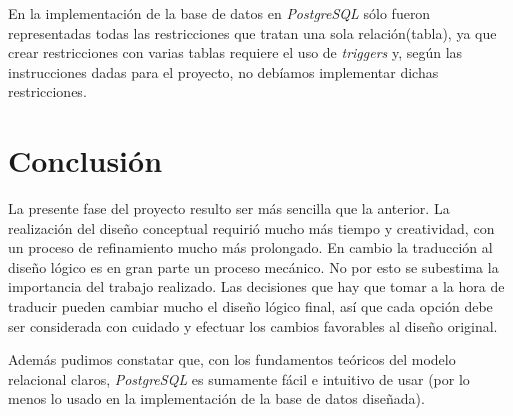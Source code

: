 \documentclass[]{report}
\begin{document}
	En la implementación de la base de datos en \emph{PostgreSQL} sólo fueron representadas todas las restricciones que tratan una sola relación(tabla), ya que crear restricciones con varias tablas requiere el uso de \emph{triggers} y, según las instrucciones dadas para el proyecto, no debíamos implementar dichas restricciones.
	
	\chapter*{Conclusión}\large
	\begin{adjustwidth}{16pt}{16pt} \normalsize		
	\hspace{1.5em}La presente fase del proyecto resulto ser más sencilla que la anterior. La realización del diseño conceptual requirió mucho más tiempo y creatividad, con un proceso de refinamiento mucho más prolongado. En cambio la traducción al diseño lógico es en gran parte un proceso mecánico. No por esto se subestima la importancia del trabajo realizado. Las decisiones que hay que tomar a la hora de traducir pueden cambiar mucho el diseño lógico final, así que cada opción debe ser considerada con cuidado y efectuar los cambios favorables al diseño original. \\ \par 
	Además pudimos constatar que, con los fundamentos teóricos del modelo relacional claros, \emph{PostgreSQL} es sumamente fácil e intuitivo de usar (por lo menos lo usado en la implementación de la base de datos diseñada). 
	\end{adjustwidth}
\end{document}
